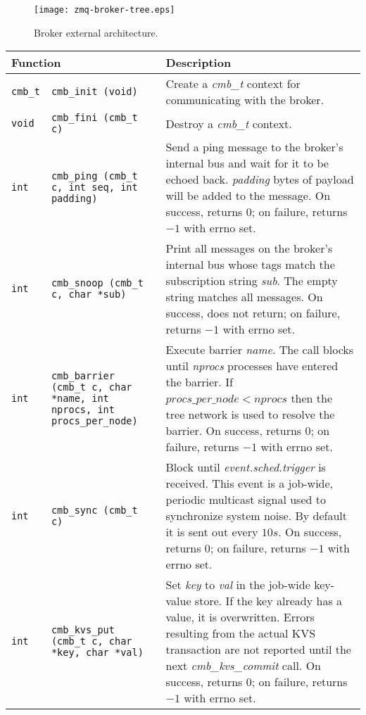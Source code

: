 \begin{figure}
\centering
\texttt{[image: zmq-broker-tree.eps]}
\caption{Broker external architecture.}
\label{fig:cmbext}
\end{figure}


\begin{table}
\centering
\begin{tabular}{|p{0.7cm}p{5cm}|p{9cm}|}\hline
\multicolumn{2}{|l|}{\textbf{Function}}
  & \textbf{Description} \\
\hline
{\tt cmb\_t} & {\tt cmb\_init (void)}
  & Create a {\em cmb\_t} context for communicating with the broker.\\
{\tt void} & {\tt cmb\_fini (cmb\_t c)}
  & Destroy a {\em cmb\_t} context.\\
\hline
{\tt int} & {\tt cmb\_ping (cmb\_t c, int seq, int padding)}
  & Send a ping message to the broker's internal bus and wait for it
    to be echoed back.  {\em padding} bytes of payload will be added to
    the message.
    On success, returns $0$; on failure, returns $-1$ with errno set.\\
\hline
{\tt int} & {\tt cmb\_snoop (cmb\_t c, char {*sub})}
  & Print all messages on the broker's internal bus whose tags match the
    subscription string {\em sub}.  The empty string matches all messages.
    On success, does not return; on failure, returns $-1$ with errno set.\\
\hline
{\tt int}
  & {\tt cmb\_barrier (cmb\_t c, char {*name}, int nprocs,
                       int procs\_per\_node)}
  & Execute barrier {\em name}.  The call blocks until {\em nprocs}
    processes have entered the barrier.  If $procs\_per\_node < nprocs$
    then the tree network is used to resolve the barrier.
    On success, returns $0$; on failure, returns $-1$ with errno set.\\
\hline
{\tt int}
  & {\tt cmb\_sync (cmb\_t c)}
  & Block until {\em event.sched.trigger} is received.  This event is
    a job-wide, periodic multicast signal used to synchronize system noise.
    By default it is sent out every $10s$.
    On success, returns $0$; on failure, returns $-1$ with errno set.\\
\hline
{\tt int}
  & {\tt cmb\_kvs\_put (cmb\_t c, char {*key}, char {*val})}
  & Set {\em key} to {\em val} in the job-wide key-value store.
    If the key already has a value, it is overwritten.
    Errors resulting from the actual KVS transaction are not reported
    until the next {\em cmb\_kvs\_commit} call.
    On success, returns $0$; on failure, returns $-1$ with errno set.\\

\end{tabular}
\end{table}
